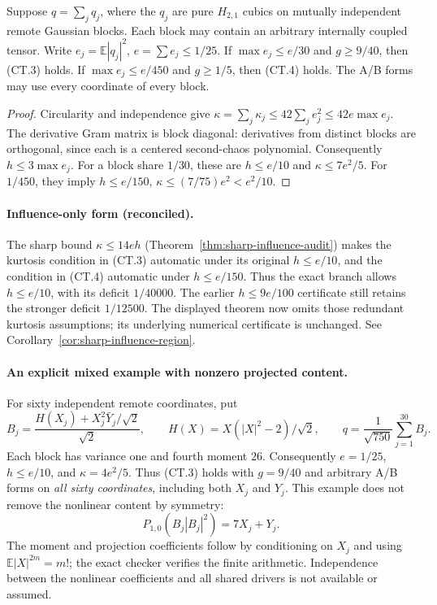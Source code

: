 \begin{corollary}
\label{cor:ct-blocks}
Suppose \(q=\sum_jq_j\), where the \(q_j\) are pure \(H_{2,1}\)
cubics on mutually independent remote Gaussian blocks. Each block
may contain an arbitrary internally coupled tensor. Write
\(e_j=\mathbb E|q_j|^2\), \(e=\sum e_j\le1/25\).
If \(\max e_j\le e/30\) and \(g\ge9/40\), then (CT.3) holds.
If \(\max e_j\le e/450\) and \(g\ge1/5\), then (CT.4) holds.
The A/B forms may use every coordinate of every block.
\end{corollary}
\begin{proof}
Circularity and independence give
\(\kappa=\sum_j\kappa_j\le42\sum_j e_j^2\le42e\max e_j\).
The derivative Gram matrix is block diagonal: derivatives from
distinct blocks are orthogonal, since each is a centered second-chaos
polynomial. Consequently \(h\le3\max e_j\).
For a block share \(1/30\), these are \(h\le e/10\) and
\(\kappa\le7e^2/5\). For \(1/450\), they imply
\(h\le e/150\), \(\kappa\le(7/75)e^2<e^2/10\).
\end{proof}

\paragraph{Influence-only form (reconciled).} The sharp bound
$\kappa\le14eh$ (Theorem~\ref{thm:sharp-influence-audit}) makes the
kurtosis condition in (CT.3) automatic under its original $h\le e/10$,
and the condition in (CT.4) automatic under $h\le e/150$.
Thus the exact branch allows $h\le e/10$, with its deficit $1/40000$.
The earlier $h\le9e/100$ certificate still retains the stronger deficit
$1/12500$. The displayed theorem now omits those redundant kurtosis assumptions; its underlying numerical certificate is unchanged. See
Corollary~\ref{cor:sharp-influence-region}.

\paragraph{An explicit mixed example with nonzero projected content.}
For sixty independent remote coordinates, put
\[
 B_j=\frac{H(X_j)+X_j^2\bar Y_j/\sqrt2}{\sqrt2},\qquad
 H(X)=X(|X|^2-2)/\sqrt2,\qquad
 q=\frac1{\sqrt{750}}\sum_{j=1}^{30}B_j .
\]
Each block has variance one and fourth moment \(26\).
Consequently \(e=1/25\), \(h\le e/10\), and \(\kappa=4e^2/5\).
Thus (CT.3) holds with \(g=9/40\) and arbitrary A/B forms on
\emph{all sixty coordinates}, including both \(X_j\) and \(Y_j\).
This example does not remove the nonlinear content by symmetry:
\[
 P_{1,0}(B_j|B_j|^2)=7X_j+Y_j .
\]
The moment and projection coefficients follow by conditioning on \(X_j\)
and using \(\mathbb E|X|^{2m}=m!\); the exact checker verifies the
finite arithmetic. Independence between the nonlinear coefficients
and all shared drivers is not available or assumed.

